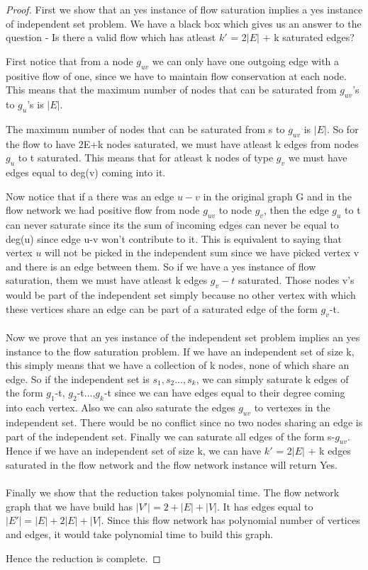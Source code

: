\documentclass[11pt]{article}
\begin{document}
\begin{proof}

First we show that an yes instance of flow saturation implies a yes instance of independent set problem. We have a black box which gives us an answer to the question - Is there a valid flow which has atleast $k'$ = 2$|E|$ + k saturated edges? 

First notice that from a node $g_{uv}$ we can only have one outgoing edge with a positive flow of one, since we have to maintain flow conservation at each node. This means that the maximum number of nodes that can be saturated from $g_{uv}$'s to $g_u$'s is $|E|$.

The maximum number of nodes that can be saturated from s to $g_{uv}$ is $|E|$. So for the flow to have 2E+k nodes saturated, we must have atleast k edges from nodes $g_u$ to t saturated. This means that for atleast k nodes of type $g_v$ we must have edges equal to deg(v) coming into it. 

Now notice that if a there was an edge $u-v$ in the original graph G and in the flow network we had positive flow from node $g_{uv}$ to node $g_v$, then the edge $g_u$ to t can never saturate since its the sum of incoming edges can never be equal to deg(u) since edge u-v won't contribute to it. This is equivalent to saying that vertex $u$ will not be picked in the independent sum since we have picked vertex v and there is an edge between them. So if we have a yes instance of flow saturation, them we must have atleast k edges  $g_{v}-t$ saturated. Those nodes v's would be part of the independent set simply because no other vertex with which these vertices share an edge can be part of a saturated edge of the form $g_{v}$-t.\\\\
Now we prove that an yes instance of the independent set problem implies an yes instance to the flow saturation problem. If we have an independent set of size k, this simply means that we have a collection of k nodes, none of which share an edge. So if the independent set is $s_1, s_2..., s_k$, we can simply saturate k edges of the form $g_1$-t, $g_2$-t...,$g_k$-t since we can have edges equal to their degree coming into each vertex. Also we can also saturate the edges $g_{uv}$ to vertexes in the independent set. There would be no conflict since no two nodes sharing an edge is part of the independent set. Finally we can saturate all edges of the form s-$g_{uv}$. Hence if we have an independent set of size k, we can have $k'$ = 2$|E|$ + k edges saturated in the flow network and the flow network instance will return Yes.\\\\
Finally we show that the reduction takes polynomial time. The flow network graph that we have build has $|V'| = 2 + |E| + |V|$. It has edges equal to $|E'| = |E| + 2|E| + |V|$. Since this flow network has polynomial number of vertices and edges, it would take polynomial time to build this graph.

Hence the reduction is complete.
\end{proof}
\end{document}
